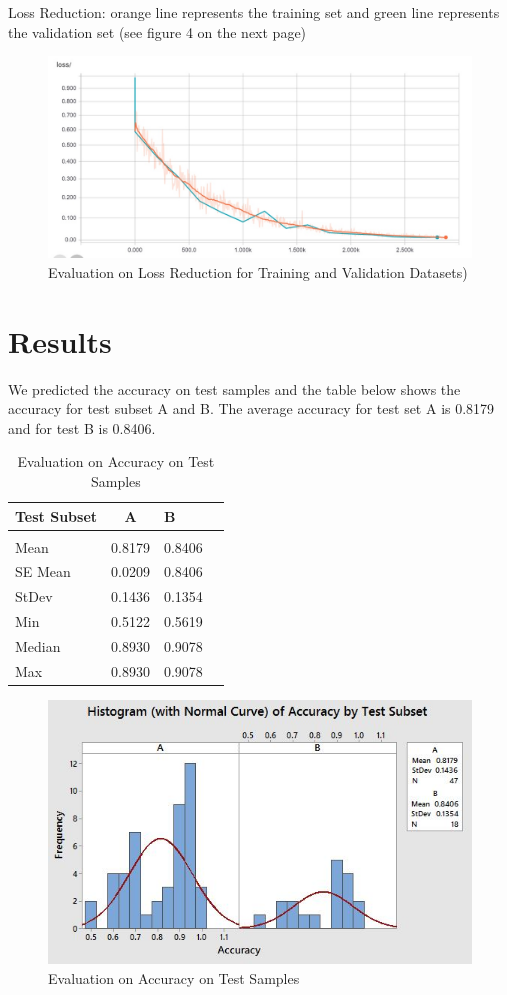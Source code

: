 \documentclass[twoside,11pt]{article}
\begin{document}
Loss Reduction: orange line represents the training set and green line represents the validation set
(see figure 4 on the next page)

\begin{figure}[htbp]
\centering
\includegraphics[width=.8\textwidth]{figure6.jpg}
\caption{Evaluation on Loss Reduction for Training and Validation Datasets)}
\label{figure1}
\end{figure}

\newpage
\section{Results} \label{results}
We predicted the accuracy on test samples and the table below shows the accuracy for test subset A and B. The average accuracy for test set A is 0.8179 and for test B is 0.8406.

\begin{table}[htbp]
  \centering 
  \begin{tabular}{lclc} 
    Test Subset & A& B \\ 
    \hline \\[-11pt]
    Mean & 0.8179&0.8406\\
    SE Mean & 0.0209 &0.8406\\
    StDev & 0.1436 & 0.1354\\
    Min & 0.5122 & 0.5619\\
    Median & 0.8930 &0.9078\\
    Max & 0.8930 &0.9078\\\hline
  \end{tabular}
  \label{tab:example} 
    \caption{Evaluation on Accuracy on Test Samples} 
\end{table}

\begin{figure}[htbp]
\centering
\includegraphics[width=.8\textwidth]{figure9.JPG}
\caption{Evaluation on Accuracy on Test Samples}
\label{figure1}
\end{figure}
\end{document}
